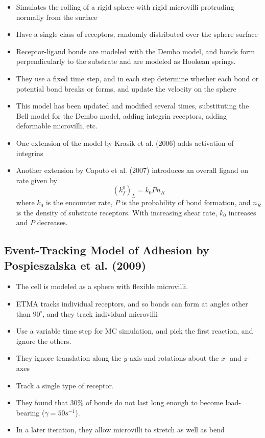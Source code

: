 \documentclass[
10pt, %
letterpaper, %
twocolumn, %
landscape %
]{article}
\begin{document}
\begin{itemize}
\item Simulates the rolling of a rigid sphere with rigid microvilli
  protruding normally from the surface
\item Have a single class of receptors, randomly distributed over the
  sphere surface
\item Receptor-ligand bonds are modeled with the Dembo model, and
  bonds form perpendicularly to the substrate and are modeled as
  Hookean springs.
\item They use a fixed time step, and in each step determine whether
  each bond or potential bond breaks or forms, and update the velocity
  on the sphere
\item This model has been updated and modified several times,
  substituting the Bell model for the Dembo model, adding integrin
  receptors, adding deformable microvilli, etc.
\item One extension of the model by Krasik et al. (2006) adds
  activation of integrins
\item Another extension by Caputo et al. (2007) introduces an overall
  ligand on rate given by
  \begin{equation}
    \label{eq:ligand_onrate}
    \left(k_f^0\right)_L = k_0 P n_R
  \end{equation}
  where $k_0$ is the encounter rate, $P$ is the probability of bond
  formation, and $n_R$ is the density of substrate receptors. With
  increasing shear rate, $k_0$ increases and $P$ decreases. 
\end{itemize}

\subsection{Event-Tracking Model of Adhesion by Pospieszalska et
  al. (2009)}
\label{sec:event-tracking-model}

\begin{itemize}
\item The cell is modeled as a sphere with flexible microvilli.
\item ETMA tracks individual receptors, and so bonds can form at
  angles other than $90^\circ$, and they track individual microvilli
\item Use a variable time step for MC simulation, and pick the first
  reaction, and ignore the others.
\item They ignore translation along the $y$-axis and rotations about
  the $x$- and $z$-axes
\item Track a single type of receptor.
\item They found that $30\%$ of bonds do not last long enough to
  become load-bearing ($\gamma = 50 s^{-1}$).
\item In a later iteration, they allow microvilli to stretch as well
  as bend
\end{itemize}
\end{document}
